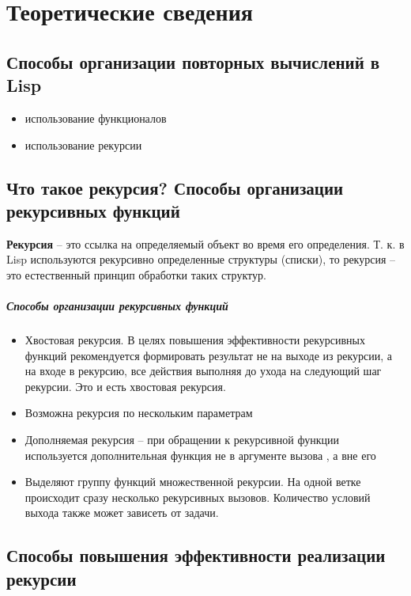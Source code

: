 \chapter{Теоретические сведения}

\section{Способы организации повторных вычислений в Lisp}

\begin{itemize}
    \item использование функционалов
    \item использование рекурсии
\end{itemize}

\section{Что такое рекурсия?
Способы организации рекурсивных функций}

\textbf{Рекурсия} -- это ссылка на определяемый объект во
время его определения.
Т. к. в Lisp используются рекурсивно определенные структуры (списки),
то рекурсия -- это естественный принцип обработки таких структур.

\paragraph{Способы организации рекурсивных функций}

\begin{itemize}
    \item Хвостовая рекурсия. В целях повышения эффективности рекурсивных
        функций рекомендуется формировать результат не на выходе из рекурсии,
        а на входе в рекурсию, все действия выполняя до ухода на следующий шаг
        рекурсии. Это и есть хвостовая рекурсия.
    \item Возможна рекурсия по нескольким параметрам
    \item Дополняемая рекурсия -- при обращении к рекурсивной функции
        используется дополнительная функция не в аргументе вызова , а вне его
    \item Выделяют группу функций множественной рекурсии. На одной
        ветке происходит сразу несколько рекурсивных вызовов. Количество
        условий выхода также может зависеть от задачи.
\end{itemize}

\section{Способы повышения эффективности реализации рекурсии}

